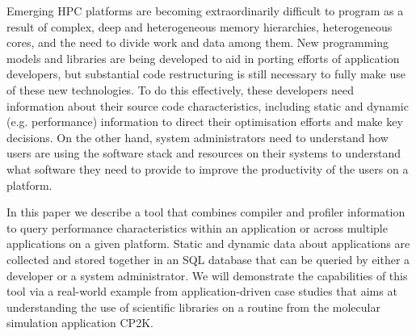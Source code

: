 Emerging HPC platforms are becoming extraordinarily difficult to program as a result of complex, deep and heterogeneous memory hierarchies, heterogeneous cores, and the need to divide work and data among them.
New programming models and libraries are being developed to aid in porting efforts of application developers, but substantial code restructuring is still necessary to fully make use of these new technologies.
To do this effectively, these developers need information about their source code characteristics, including static and dynamic (e.g. performance) information to direct their optimisation efforts and make key decisions.
On the other hand, system administrators need to understand how users are using the software stack and resources on their systems to understand what software they need to provide to improve the productivity of the users on a platform.

In this paper we describe a tool that combines compiler and profiler information to query performance characteristics within an application or across multiple applications on a given platform.
Static and dynamic data about applications are collected and stored together in an \acs{SQL} database that can be queried by either a developer or a system administrator.
We will demonstrate the capabilities of this tool via a real-world example from application-driven case studies that aims at understanding the use of scientific libraries on a routine from the molecular simulation application CP2K.
